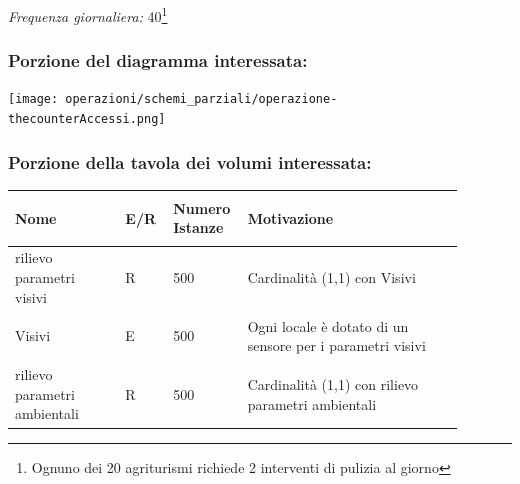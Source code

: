 \documentclass[12pt,a4paper]{article}
\begin{document}
\noindent\textit{Frequenza giornaliera:} 40\footnote{Ognuno dei 20 agriturismi richiede 2 interventi di pulizia al giorno}

\subsubsection*{Porzione del diagramma interessata:}

\texttt{[image: operazioni/schemi\_parziali/operazione-\\thecounterAccessi.png]} 
\subsubsection*{Porzione della tavola dei volumi interessata:}
\begin{center}\setlength{\extrarowheight}{1.5pt}\begin{longtable}{|p{0.23\linewidth}|p{0.1\linewidth}|p{0.11\linewidth}|p{0.45\linewidth}|}
\hline \textbf{Nome}   & \begin{center}\vspace{-15pt}\textbf{E/R}\end{center} & \textbf{Numero Istanze} & \textbf{Motivazione}\\ 
\hline
rilievo parametri visivi 				& \begin{center}
\vspace{-25pt}R
\end{center}
					& \begin{center}
					\vspace{-25pt}500\end{center}
					&  Cardinalità (1,1) con Visivi \\ 

\hline
Visivi 				& \begin{center}
\vspace{-25pt}E
\end{center}
					& \begin{center}
					\vspace{-25pt}500\end{center}
					&  Ogni locale è dotato di un sensore per i parametri visivi \\ 

\hline
rilievo parametri ambientali 				& \begin{center}
\vspace{-25pt}R
\end{center}
					& \begin{center}
					\vspace{-25pt}500\end{center}
					&  Cardinalità (1,1) con rilievo parametri ambientali \\ 


\end{longtable}
\end{center}
\end{document}
